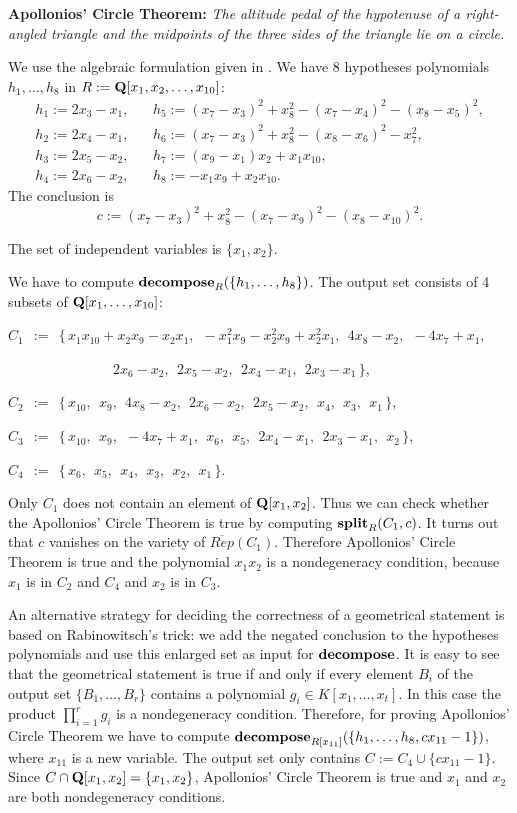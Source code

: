 \bigskip 
{\bf Apollonios' Circle Theorem:} {\em The altitude pedal of the hypotenuse
of a right-angled triangle and the midpoints of the three sides of the
triangle lie on a circle.}

\medskip
We use the algebraic formulation given in \cite{Buch87}. We
have 8 hypotheses polynomials $h_1,\ldots,h_8$ in 
$R:={\bf Q}[x_1,x_2,\ldots,x_{10}]$: 
\[
\begin{array}{ll}
h_1:=2x_3-x_1, & ~~~~
h_5:=(x_7-x_3)^2+x_8^2-(x_7-x_4)^2-(x_8-x_5)^2, \\
h_2:=2x_4-x_1, & ~~~~
h_6:=(x_7-x_3)^2+x_8^2-(x_8-x_6)^2-x_7^2, \\
h_3:=2x_5-x_2, & ~~~~
h_7:=(x_9-x_1)x_2+x_1x_{10}, \\
h_4:=2x_6-x_2, & ~~~~
h_8:=-x_1x_9+x_2x_{10}. 
\end{array}
\]
The conclusion is
\[ c:=(x_7-x_3)^2+x_8^2-(x_7-x_9)^2-(x_8-x_{10})^2. \]

The set of independent variables is $\{x_1,x_2\}$.

We have to compute 
${\bf decompose}_R(\{h_1,\ldots,h_8\})$. The output set consists of
4 subsets of ${\bf Q}[x_1,\ldots,x_{10}]$:

\smallskip
$C_1~~:=~~\{\, x_1 x_{10}+ x_2 x_9- x_2 x_1,~~ - x_1^2 x_9- x_2
^2 x_9+ x_2^2 x_1,~~ 4 x_8- x_2,~~ -4 x_7+ x_1,$

~~~~~~~~~~~~~~~$2 x_6- x_2,~~ 2 x_5- x_2,~~ 2 x_4- x_1,~~ 2 x_3- x_1\,\}$,

\smallskip
$C_2~~:=~~\{\, x_{10},~~ x_9,~~ 4 x_8-
 x_2,~~ 2 x_6- x_2,~~ 2 x_5- x_2,~~  x_4,~~  x_3,~~  x_1\,\}$,

\smallskip
$C_3~~:=~~ \{\, x_{10},~~ x_9,~~ -4 x_7+ x_1,~~  x_6,~~  x_5,~~ 2 x_4- x_1,~~ 2 x_3- x_1,~~  x_2\,\}$,

\smallskip
$C_4~~:=~~ \{\, x_6,~~  x_5,~~  x_4,~~  x_3,~~ 
 x_2,~~  x_1\,\}$.

\medskip
Only $C_1$ does not contain an element of ${\bf Q}[x_1,x_2]$. Thus
we can check whether the Apollonios' Circle Theorem is true by
computing ${\bf split}_R(C_1,c)$. It turns out that $c$ vanishes on the 
variety of $\overline{Rep}(C_1)$. Therefore
Apollonios' Circle Theorem is true and the polynomial $x_1x_2$
is a nondegeneracy condition, because $x_1$ is in $C_2$ and $C_4$ and
$x_2$ is in $C_3$.

An alternative strategy for deciding the correctness of a geometrical 
statement
is based on Rabinowitsch's trick: we add the negated conclusion to the
hypotheses polynomials and use this enlarged set as input for 
${\bf decompose}$. It is easy to see \cite{Kalk92b} that 
the geometrical statement is true if and only if every element
$B_i$ of the output set $\{B_1,\ldots,B_r\}$ contains a polynomial $g_i\in
K[x_1,\ldots,x_t]$. In this case the product $\prod_{i=1}^r g_i$ is a
nondegeneracy condition. Therefore, for proving Apollonios' Circle Theorem
we have to compute 
${\bf decompose}_{R[x_{11}]}(\{h_1,\ldots,h_8,cx_{11}-1\})$, 
where $x_{11}$ is a new
variable. The output set only contains
$C:=C_4\cup\{cx_{11}-1\}$.
Since $C\cap {\bf Q}[x_1,x_2]=\{x_1,x_2\}$, 
Apollonios' Circle Theorem is true and
$x_1$ and $x_2$ are both nondegeneracy conditions.

